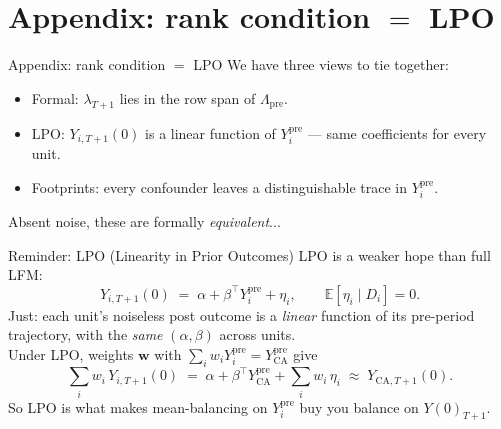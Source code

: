 \documentclass[xcolor=dvipsnames]{beamer}
\newcommand\makegaps{\addtolength{\itemsep}{.25\baselineskip}}
\newcommand\E{\mathbb{E}}
\newcommand{\mb}{\mathbf}
\newcommand{\Ypre}{Y^{\text{pre}}}        %
\newcommand{\ypre}{Y^{\text{pre}}_i}      %
\newcommand{\Lpre}{\Lambda_{\text{pre}}}  %
\newcommand{\Wco}{\mb{w}}                 %
\begin{document}

\appendix
\section*{Appendix: rank condition $=$ LPO}

\begin{frame}{Appendix: rank condition $=$ LPO}
\small
{} We have three views to tie together:
\begin{itemize}
  \item Formal: $\lambda_{T+1}$ lies in the row span of $\Lpre$.
  \item LPO: $Y_{i,T+1}(0)$ is a linear function of $\ypre$ --- same coefficients for every unit.
  \item Footprints: every confounder leaves a distinguishable trace in $\ypre$.
\end{itemize}
 Absent noise, these are formally \emph{equivalent}...
\end{frame}

\begin{frame}{Reminder: LPO (Linearity in Prior Outcomes)}
\small
LPO is a weaker hope than full LFM:
\[
Y_{i,T+1}(0) \;=\; \alpha + \beta^\top \ypre + \eta_i, \qquad \E[\eta_i \mid D_i] = 0.
\]
 Just: each unit's noiseless post outcome is a \emph{linear} function of its pre-period trajectory, with the \emph{same} $(\alpha, \beta)$ across units.\\[2ex]
 Under LPO, weights $\Wco$ with $\sum_i w_i \ypre = Y^{\text{pre}}_{\text{CA}}$ give
\[
\sum_i w_i\, Y_{i,T+1}(0) \;=\; \alpha + \beta^\top Y^{\text{pre}}_{\text{CA}} + \sum_i w_i\, \eta_i \;\approx\; Y_{\text{CA},T+1}(0).
\]
So LPO is what makes mean-balancing on $\ypre$ buy you balance on $Y(0)_{T+1}$.
\end{frame}
\end{document}
